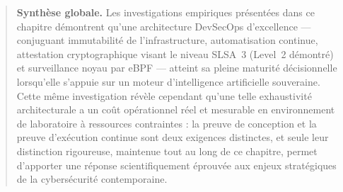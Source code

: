 \begin{quote}
\textbf{Synthèse globale.} Les investigations empiriques présentées dans ce chapitre démontrent qu'une architecture DevSecOps d'excellence — conjuguant immutabilité de l'infrastructure, automatisation continue, attestation cryptographique visant le niveau SLSA~3 (Level~2 démontré) et surveillance noyau par eBPF — atteint sa pleine maturité décisionnelle lorsqu'elle s'appuie sur un moteur d'intelligence artificielle souveraine. Cette même investigation révèle cependant qu'une telle exhaustivité architecturale a un coût opérationnel réel et mesurable en environnement de laboratoire à ressources contraintes : la preuve de conception et la preuve d'exécution continue sont deux exigences distinctes, et seule leur distinction rigoureuse, maintenue tout au long de ce chapitre, permet d'apporter une réponse scientifiquement éprouvée aux enjeux stratégiques de la cybersécurité contemporaine.
\end{quote}